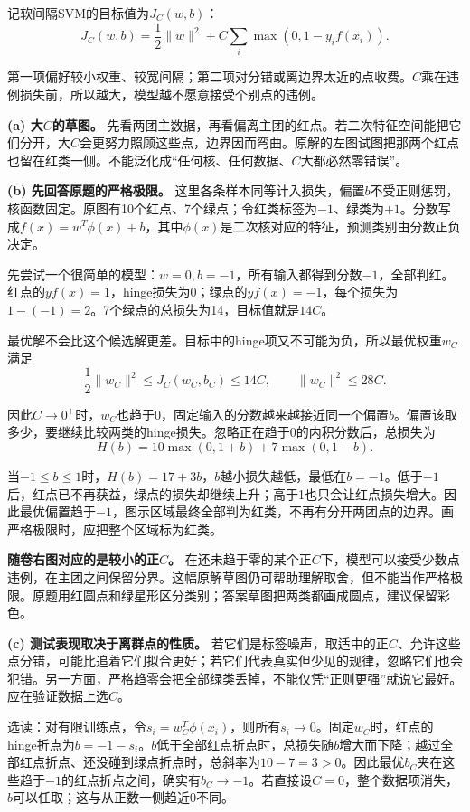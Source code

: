 记软间隔SVM的目标值为\(J_C(w,b)\)：
\[
J_C(w,b)=\frac12\|w\|^2+C\sum_i\max(0,1-y_if(x_i)).
\]


第一项偏好较小权重、较宽间隔；第二项对分错或离边界太近的点收费。\(C\)乘在违例损失前，所以越大，模型越不愿意接受个别点的违例。


\textbf{(a) 大\(C\)的草图。} 先看两团主数据，再看偏离主团的红点。若二次特征空间能把它们分开，大\(C\)会更努力照顾这些点，边界因而弯曲。原解的左图试图把那两个红点也留在红类一侧。不能泛化成“任何核、任何数据、\(C\)大都必然零错误”。


\textbf{(b) 先回答原题的严格极限。} 这里各条样本同等计入损失，偏置\(b\)不受正则惩罚，核函数固定。原图有10个红点、7个绿点；令红类标签为\(-1\)、绿类为\(+1\)。分数写成\(f(x)=w^T\phi(x)+b\)，其中\(\phi(x)\)是二次核对应的特征，预测类别由分数正负决定。


先尝试一个很简单的模型：\(w=0,b=-1\)，所有输入都得到分数\(-1\)，全部判红。红点的\(yf(x)=1\)，hinge损失为0；绿点的\(yf(x)=-1\)，每个损失为\(1-(-1)=2\)。7个绿点的总损失为14，目标值就是\(14C\)。


最优解不会比这个候选解更差。目标中的hinge项又不可能为负，所以最优权重\(w_C\)满足
\[
\frac12\|w_C\|^2\le J_C(w_C,b_C)\le14C,
\qquad \|w_C\|^2\le28C.
\]


因此\(C\to0^+\)时，\(w_C\)也趋于0，固定输入的分数越来越接近同一个偏置\(b\)。偏置该取多少，要继续比较两类的hinge损失。忽略正在趋于0的内积分数后，总损失为
\[
H(b)=10\max(0,1+b)+7\max(0,1-b).
\]


当\(-1\le b\le1\)时，\(H(b)=17+3b\)，\(b\)越小损失越低，最低在\(b=-1\)。低于\(-1\)后，红点已不再获益，绿点的损失却继续上升；高于1也只会让红点损失增大。因此最优偏置趋于\(-1\)，图示区域最终全部判为红类，不再有分开两团点的边界。画严格极限时，应把整个区域标为红类。


\textbf{随卷右图对应的是较小的正\(C\)。} 在还未趋于零的某个正\(C\)下，模型可以接受少数点违例，在主团之间保留分界。这幅原解草图仍可帮助理解取舍，但不能当作严格极限。原题用红圆点和绿星形区分类别；答案草图把两类都画成圆点，建议保留彩色。


\textbf{(c) 测试表现取决于离群点的性质。} 若它们是标签噪声，取适中的正\(C\)、允许这些点分错，可能比追着它们拟合更好；若它们代表真实但少见的规律，忽略它们也会犯错。另一方面，严格趋零会把全部绿类丢掉，不能仅凭“正则更强”就说它最好。应在验证数据上选\(C\)。


选读：对有限训练点，令\(s_i=w_C^T\phi(x_i)\)，则所有\(s_i\to0\)。固定\(w_C\)时，红点的hinge折点为\(b=-1-s_i\)。\(b\)低于全部红点折点时，总损失随\(b\)增大而下降；越过全部红点折点、还没碰到绿点折点时，总斜率为\(10-7=3>0\)。因此最优\(b_C\)夹在这些趋于\(-1\)的红点折点之间，确实有\(b_C\to-1\)。若直接设\(C=0\)，整个数据项消失，\(b\)可以任取；这与从正数一侧趋近0不同。


